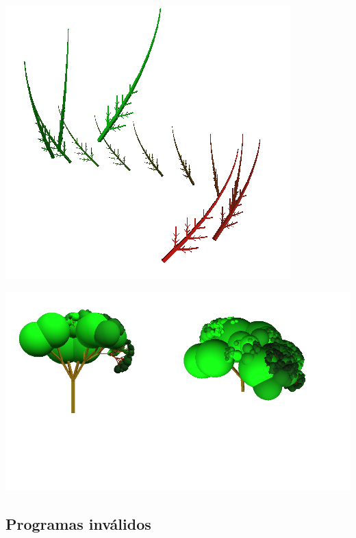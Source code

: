 \centerline{\includegraphics[scale=0.40]{../imagenes/eg26.png}}




\centerline{\includegraphics[scale=0.40]{../imagenes/eg27.png}}
\subsection{Programas inv\'alidos}
